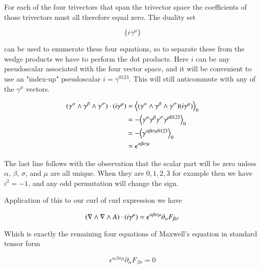 For each of the four trivectors that span the trivector space the coefficients of those trivectors must all therefore equal zero.  The duality set

\begin{equation*}
\{ i \gamma^{\mu} \}
\end{equation*}

can be used to enumerate these four equations, so to separate these from the wedge products we have to perform the dot products.  Here $i$ can be any pseudoscalar
associated with the four vector space, and it will be convenient to use an "index-up" pseudoscalar $i=\gamma^{0123}$.   This will still anticommute with any of the $\gamma^{\mu}$ vectors.

\begin{align*}
(\gamma^{\alpha} \wedge \gamma^{\beta} \wedge \gamma^{\sigma}) \cdot ( i \gamma^{\mu} )
&= {\left\langle{{ (\gamma^{\alpha} \wedge \gamma^{\beta} \wedge \gamma^{\sigma}) ( i \gamma^{\mu} ) }}\right\rangle}_{0} \\
&= -{\left\langle{{ \gamma^{\alpha} \gamma^{\beta} \gamma^{\sigma} \gamma^{\mu 0123} }}\right\rangle}_{0} \\
&= -{\left\langle{{ \gamma^{\alpha \beta \sigma \mu 0123} }}\right\rangle}_{0} \\
&= \epsilon^{ \alpha \beta \sigma \mu } \\
\end{align*}

The last line follows with the observation that the scalar part will be zero unless $\alpha$, $\beta$, $\sigma$, and $\mu$ are all unique.  When they are $0,1,2,3$ for example then we have $i^2 = -1$, and any odd permutation will change the sign.


Application of this to our curl of curl expression we have

\begin{equation*}
(\nabla \wedge \nabla \wedge A) \cdot (i \gamma^{\mu} ) = \epsilon^{ \alpha \beta \sigma \mu } \partial_{\alpha} F_{\beta\sigma}
\end{equation*}

Which is exactly the remaining four equations of Maxwell's equation in standard tensor form

\begin{equation}
\epsilon^{ \alpha \beta \sigma \mu } \partial_{\alpha} F_{\beta\sigma} = 0
\end{equation}

